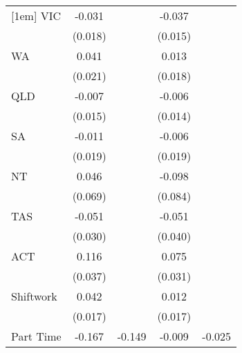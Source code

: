 {\begin{tabular}{l*{4}{c}}
[1em]
VIC                 &      -0.031         &                     &      -0.037\sym{*}  &                     \\
                    &     (0.018)         &                     &     (0.015)         &                     \\
[1em]
WA                  &       0.041         &                     &       0.013         &                     \\
                    &     (0.021)         &                     &     (0.018)         &                     \\
[1em]
QLD                 &      -0.007         &                     &      -0.006         &                     \\
                    &     (0.015)         &                     &     (0.014)         &                     \\
[1em]
SA                  &      -0.011         &                     &      -0.006         &                     \\
                    &     (0.019)         &                     &     (0.019)         &                     \\
[1em]
NT                  &       0.046         &                     &      -0.098         &                     \\
                    &     (0.069)         &                     &     (0.084)         &                     \\
[1em]
TAS                 &      -0.051         &                     &      -0.051         &                     \\
                    &     (0.030)         &                     &     (0.040)         &                     \\
[1em]
ACT                 &       0.116\sym{**} &                     &       0.075\sym{*}  &                     \\
                    &     (0.037)         &                     &     (0.031)         &                     \\
[1em]
Shiftwork           &       0.042\sym{*}  &                     &       0.012         &                     \\
                    &     (0.017)         &                     &     (0.017)         &                     \\
[1em]
Part Time           &      -0.167\sym{***}&      -0.149\sym{***}&      -0.009         &      -0.025\sym{*}  \\

\end{tabular}}
